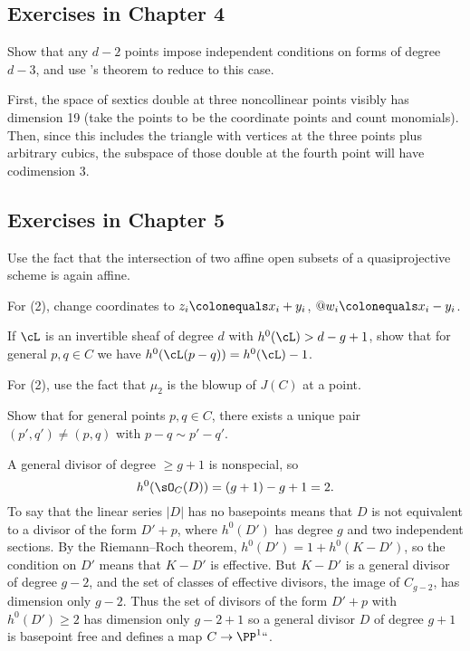 \subsection*{Exercises in Chapter 4}

Show that any $d-2$ points impose independent conditions on
forms of degree $d-3$, and use
's theorem
%
to reduce to this case.

First, the space of sextics double at three noncollinear points
visibly has dimension 19 (take the points to be the coordinate points
and count monomials). Then, since this includes the triangle with
vertices at the three points plus arbitrary cubics, the subspace of
those double at the fourth point will have codimension 3.

\subsection*{Exercises in Chapter 5}

 Use the fact that the intersection of two affine open
subsets of a quasiprojective scheme is again affine.

For (2), change coordinates to
$z_i \colonequals x_i+y_i$, $@w_i \colonequals x_i - y_i$.

If $\cL$ is an invertible sheaf of degree $d$ with $h^0(\cL) > d-g+1$,
show that for general $p, q \in C$ we have $h^0(\cL(p-q))  = h^0(\cL) - 1$.

For (2), use the fact that $\mu_2$ is the blowup
%
of $J(C)$ at a point.

Show that for general points $p, q \in C$, there exists a unique pair
$(p',q') \neq (p,q)$ with $p - q \sim p'-q'$.

A general divisor of degree $\geq g+1$ is nonspecial, so
$$h^0(\sO_C(D)) = (g+1)-g+1 = 2.$$
To say that the linear series $|D|$ has no basepoints means that $D$ is not equivalent to a divisor of the form
$D'+p$, where $h^0(D')$ has degree $g$ and two independent sections.
By the
Riemann--Roch theorem,
%
$h^0(D') = 1+h^0(K-D')$,
so the condition on $D'$ means that $K-D'$ is effective.
But $K-D'$ is a general divisor of degree $g-2$, and
the set of classes of effective divisors, the image of $C_{g-2}$, has dimension only $g-2$.
Thus the set of divisors of the form $D'+p$ with $h^0(D') \geq 2$ has dimension only $g -2 +1$
so a general divisor $D$ of degree $g+1$ is basepoint free and defines a map $C\to \PP^1` `$.

